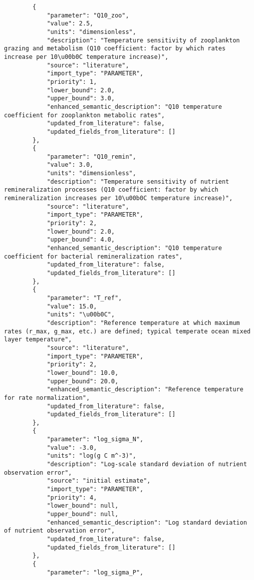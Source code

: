 \begin{lstlisting}
        {
            "parameter": "Q10_zoo",
            "value": 2.5,
            "units": "dimensionless",
            "description": "Temperature sensitivity of zooplankton grazing and metabolism (Q10 coefficient: factor by which rates increase per 10\u00b0C temperature increase)",
            "source": "literature",
            "import_type": "PARAMETER",
            "priority": 1,
            "lower_bound": 2.0,
            "upper_bound": 3.0,
            "enhanced_semantic_description": "Q10 temperature coefficient for zooplankton metabolic rates",
            "updated_from_literature": false,
            "updated_fields_from_literature": []
        },
        {
            "parameter": "Q10_remin",
            "value": 3.0,
            "units": "dimensionless",
            "description": "Temperature sensitivity of nutrient remineralization processes (Q10 coefficient: factor by which remineralization increases per 10\u00b0C temperature increase)",
            "source": "literature",
            "import_type": "PARAMETER",
            "priority": 2,
            "lower_bound": 2.0,
            "upper_bound": 4.0,
            "enhanced_semantic_description": "Q10 temperature coefficient for bacterial remineralization rates",
            "updated_from_literature": false,
            "updated_fields_from_literature": []
        },
        {
            "parameter": "T_ref",
            "value": 15.0,
            "units": "\u00b0C",
            "description": "Reference temperature at which maximum rates (r_max, g_max, etc.) are defined; typical temperate ocean mixed layer temperature",
            "source": "literature",
            "import_type": "PARAMETER",
            "priority": 2,
            "lower_bound": 10.0,
            "upper_bound": 20.0,
            "enhanced_semantic_description": "Reference temperature for rate normalization",
            "updated_from_literature": false,
            "updated_fields_from_literature": []
        },
        {
            "parameter": "log_sigma_N",
            "value": -3.0,
            "units": "log(g C m^-3)",
            "description": "Log-scale standard deviation of nutrient observation error",
            "source": "initial estimate",
            "import_type": "PARAMETER",
            "priority": 4,
            "lower_bound": null,
            "upper_bound": null,
            "enhanced_semantic_description": "Log standard deviation of nutrient observation error",
            "updated_from_literature": false,
            "updated_fields_from_literature": []
        },
        {
            "parameter": "log_sigma_P",

\end{lstlisting}
